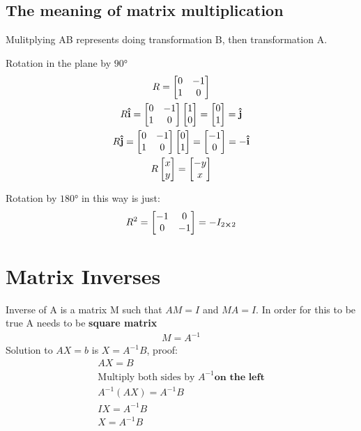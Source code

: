 \documentclass{article}
\begin{document}
    \subsection{The meaning of matrix multiplication}
    Mulitplying AB represents doing transformation B, then transformation A.\\

    \begin{example}
        Rotation in the plane by $\ang{90}$
        \begin{gather*}
            R=\bmqty{0 & -1 \\ 1 & 0}\\
            R\vu{i} = \bmqty{0 & -1 \\ 1 & 0}\bmqty{1 \\ 0} = \bmqty{0 \\ 1} = \vu{j}\\
            R\vu{j}=\bmqty{0 & -1 \\ 1 & 0 }\bmqty{0 \\ 1 } = \bmqty{-1 \\ 0 } = -\vu{i}\\
            R\bmqty{x \\ y} = \bmqty{-y \\ x}
        \end{gather*}
    \end{example}

    \begin{example}
        Rotation by $\ang{180}$ in this way is just:
        \begin{gather}
            R^2 = \bmqty{-1 & 0 \\ 0 & -1} = -I_{2\cross2}
        \end{gather}
    \end{example}

    \section{Matrix Inverses}
    Inverse of A is a matrix M such that $AM=I$ and $MA=I$. In order for this to be true A needs to be \textbf{square matrix}\\
    \begin{gather*}
        M=A^{-1}
    \end{gather*}
    Solution to $AX=b$ is $X=A^{-1}B$, proof:
    \begin{gather*}
        AX=B\\
        \text{Multiply both sides by $A^{-1} \textbf{on the left}$}\\
        A^{-1}(AX)=A^{-1}B\\
        IX=A^{-1}B\\
        X=A^{-1}B
    \end{gather*}
\end{document}
